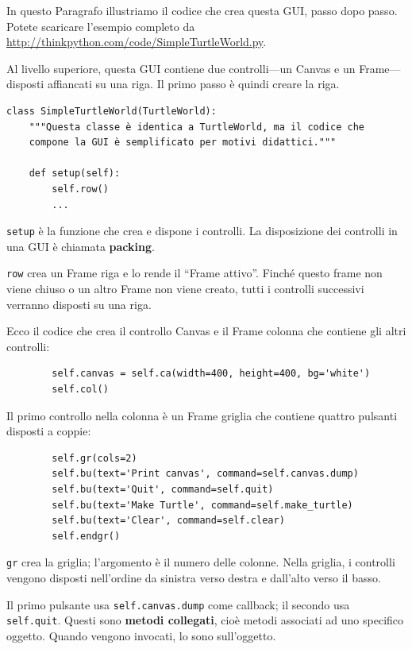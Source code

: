\documentclass[10pt]{book}
\begin{document}
In questo Paragrafo illustriamo il codice che crea questa GUI, passo dopo passo. Potete scaricare l'esempio completo da \url{http://thinkpython.com/code/SimpleTurtleWorld.py}.

Al livello superiore, questa GUI contiene due controlli---un Canvas e un Frame---disposti affiancati su una riga. Il primo passo è quindi creare la riga.

\begin{verbatim}
class SimpleTurtleWorld(TurtleWorld):
    """Questa classe è identica a TurtleWorld, ma il codice che
    compone la GUI è semplificato per motivi didattici."""

    def setup(self):
        self.row()
        ...
\end{verbatim}
%
{\tt setup} è la funzione che crea e dispone i controlli. La disposizione dei controlli in una GUI è chiamata {\bf packing}.

{\tt row} crea un Frame riga e lo rende il ``Frame attivo''.
Finché questo frame non viene chiuso o un altro Frame non viene creato, tutti i controlli successivi verranno disposti su una riga.

Ecco il codice che crea il controllo Canvas e il Frame colonna che contiene gli altri controlli:

\begin{verbatim}
        self.canvas = self.ca(width=400, height=400, bg='white')
        self.col()
\end{verbatim}
%
Il primo controllo nella colonna è un Frame griglia che contiene quattro pulsanti disposti a coppie:

\begin{verbatim}
        self.gr(cols=2)
        self.bu(text='Print canvas', command=self.canvas.dump)
        self.bu(text='Quit', command=self.quit)
        self.bu(text='Make Turtle', command=self.make_turtle)
        self.bu(text='Clear', command=self.clear)
        self.endgr()
\end{verbatim}
%
{\tt gr} crea la griglia; l'argomento è il numero delle colonne. Nella griglia, i controlli vengono disposti nell'ordine da sinistra verso destra e dall'alto verso il basso.

Il primo pulsante usa {\tt self.canvas.dump} come callback; il secondo usa {\tt self.quit}.  Questi sono {\bf metodi collegati}, cioè metodi associati ad uno specifico oggetto. Quando vengono invocati, lo sono sull'oggetto.
\end{document}
